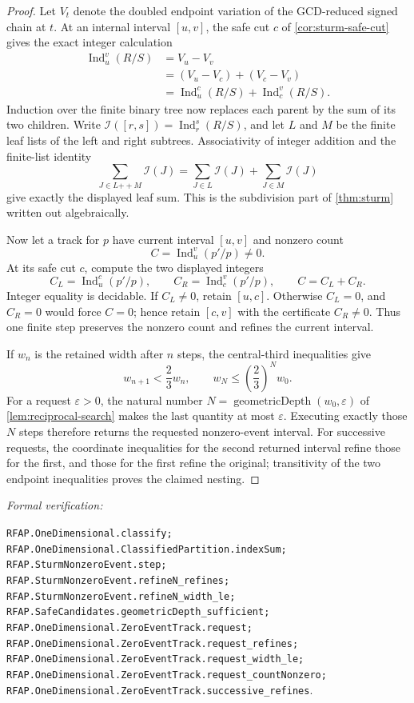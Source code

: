 \documentclass[11pt]{article}
\newcommand{\Ind}{\operatorname{Ind}}
\newcommand{\eps}{\varepsilon}
\newcommand{\leanref}[1]{\par\smallskip\noindent
  \emph{Formal verification:}\par\nobreak
  {\raggedright\nolinkurl{#1}.\par}}
\begin{document}
\begin{proof}
Let $V_t$ denote the doubled endpoint variation of the GCD-reduced signed
chain at $t$.  At an internal interval $[u,v]$, the safe cut $c$ of
\cref{cor:sturm-safe-cut} gives the exact integer calculation
\[
\begin{aligned}
 \Ind_u^v(R/S)
   &=V_u-V_v\\
   &=(V_u-V_c)+(V_c-V_v)\\
   &=\Ind_u^c(R/S)+\Ind_c^v(R/S).
\end{aligned}
\]
Induction over the finite binary tree now replaces each parent by the sum of
its two children.  Write
$\mathcal I([r,s])=\Ind_r^s(R/S)$, and let $L$ and $M$ be the finite leaf
lists of the left and right subtrees.  Associativity of integer addition and
the finite-list identity
\[
 \sum_{J\in L\mathbin{++}M}\mathcal I(J)
   =\sum_{J\in L}\mathcal I(J)+\sum_{J\in M}\mathcal I(J)
\]
give exactly the displayed leaf sum.  This is the subdivision part of
\cref{thm:sturm} written out algebraically.

Now let a track for $p$ have current interval $[u,v]$ and nonzero count
\[
                         C=\Ind_u^v(p'/p)\ne0.
\]
At its safe cut $c$, compute the two displayed integers
\[
 C_L=\Ind_u^c(p'/p),\qquad C_R=\Ind_c^v(p'/p),
 \qquad C=C_L+C_R.
\]
Integer equality is decidable.  If $C_L\ne0$, retain $[u,c]$.  Otherwise
$C_L=0$, and $C_R=0$ would force $C=0$; hence retain $[c,v]$ with the
certificate $C_R\ne0$.  Thus one finite step preserves the nonzero count
and refines the current interval.

If $w_n$ is the retained width after $n$ steps, the central-third
inequalities give
\[
                 w_{n+1}<\frac23w_n,
 \qquad          w_N\le\left(\frac23\right)^Nw_0.
\]
For a request $\eps>0$, the natural number
$N=\operatorname{geometricDepth}(w_0,\eps)$ of
\cref{lem:reciprocal-search} makes the last quantity at most $\eps$.
Executing exactly those $N$ steps therefore
returns the requested nonzero-event interval.  For successive requests,
the coordinate inequalities for the second returned interval refine those
for the first, and those for the first refine the original; transitivity of
the two endpoint inequalities proves the claimed nesting.
\end{proof}

\leanref{RFAP.OneDimensional.classify;
RFAP.OneDimensional.ClassifiedPartition.indexSum;
RFAP.SturmNonzeroEvent.step;
RFAP.SturmNonzeroEvent.refineN_refines;
RFAP.SturmNonzeroEvent.refineN_width_le;
RFAP.SafeCandidates.geometricDepth_sufficient;
RFAP.OneDimensional.ZeroEventTrack.request;
RFAP.OneDimensional.ZeroEventTrack.request_refines;
RFAP.OneDimensional.ZeroEventTrack.request_width_le;
RFAP.OneDimensional.ZeroEventTrack.request_countNonzero;
RFAP.OneDimensional.ZeroEventTrack.successive_refines}
\end{document}
